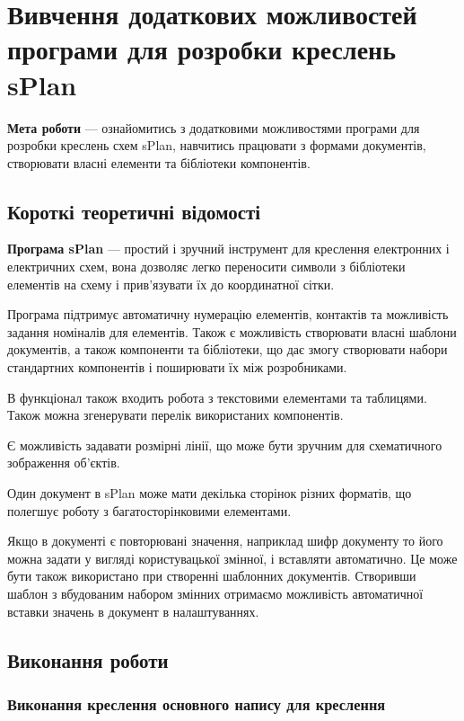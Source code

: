 \chapter[~]{Вивчення додаткових можливостей програми для розробки креслень sPlan}

\textbf{Мета роботи} --- ознайомитись з додатковими можливостями програми для розробки креслень схем
sPlan, навчитись працювати з формами документів, створювати власні елементи та бібліотеки
компонентів.

\section{Короткі теоретичні відомості}

\textbf{Програма sPlan} --- простий і зручний інструмент для креслення електронних і електричних схем, вона
дозволяє легко переносити символи з бібліотеки елементів на схему і прив'язувати їх до координатної
сітки.

Програма підтримує автоматичну нумерацію елементів, контактів та можливість задання номіналів для
елементів. Також є можливість створювати власні шаблони документів, а також компоненти та
бібліотеки, що дає змогу створювати набори стандартних компонентів і поширювати їх між розробниками.

В функціонал також входить робота з текстовими елементами та таблицями. Також можна згенерувати
перелік використаних компонентів.

Є можливість задавати розмірні лінії, що може бути зручним для схематичного зображення об'єктів.

Один документ в sPlan може мати декілька сторінок різних форматів, що полегшує роботу з
багатосторінковими елементами.

Якщо в документі є повторювані значення, наприклад шифр документу то його можна задати у вигляді
користувацької змінної, і вставляти автоматично. Це може бути також використано при створенні
шаблонних документів. Створивши шаблон з вбудованим набором змінних отримаємо можливість
автоматичної вставки значень в документ в налаштуваннях.

\section{Виконання роботи}
\subsection{Виконання креслення основного напису для креслення}

